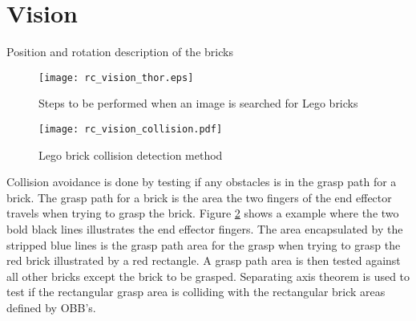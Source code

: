 \section{Vision}
\label{sec:rc_hmi_sec}
Position and rotation description of the bricks \\


	
	\begin{figure}[H]
		\centering
	    \texttt{[image: rc\_vision\_thor.eps]}
	    \caption{Steps to be performed when an image is searched for Lego bricks}
		\label{fig:rc_vision_steps_thor}
	\end{figure}
	
	\begin{figure}[H]
		\centering
	    \texttt{[image: rc\_vision\_collision.pdf]}
	    \caption{Lego brick collision detection method}
		\label{fig:rc_vision_collision}
	\end{figure}
	
Collision avoidance is done by testing if any obstacles is in the grasp path for a brick. The grasp path for a brick is the area the two fingers of the end effector travels when trying to grasp the brick. Figure \ref{fig:rc_vision_collision} shows a example where the two bold black lines illustrates the end effector fingers. The area encapsulated by the stripped blue lines is the grasp path area for the grasp when trying to grasp the red brick illustrated by a red rectangle. A grasp path area is then tested against all other bricks except the brick to be grasped. Separating axis theorem\cite{Gottschalk:1996:OHS:237170.237244} is used to test if the rectangular grasp area is colliding with the rectangular brick areas defined by OBB's.